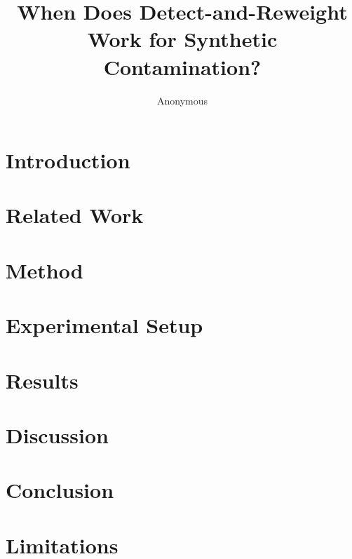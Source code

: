 \documentclass[11pt]{article}
\title{When Does Detect-and-Reweight Work for Synthetic Contamination?}
\author{Anonymous}
\begin{document}
\maketitle

\begin{abstract}

\end{abstract}

\section{Introduction}
\label{sec:intro}


\section{Related Work}
\label{sec:related}


\section{Method}
\label{sec:method}


\section{Experimental Setup}
\label{sec:experiments}


\section{Results}
\label{sec:results}


\section{Discussion}
\label{sec:discussion}


\section{Conclusion}
\label{sec:conclusion}


\section*{Limitations}
\label{sec:limitations}




\appendix

\end{document}
